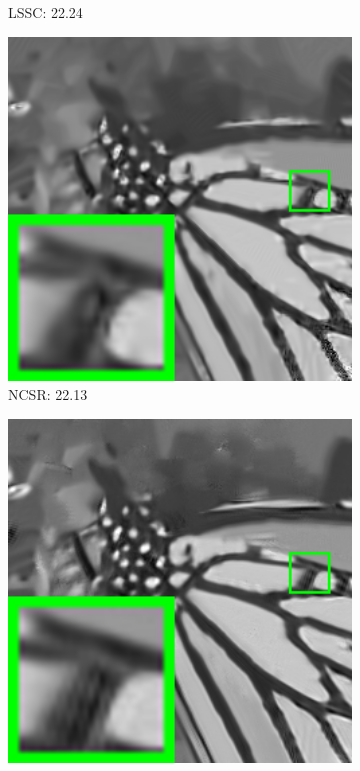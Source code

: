 \begin{figure}
\begin{adjustwidth}{-2cm}{}
\begin{subfigure}[t]{0.19\textwidth}
		\caption{LSSC: 22.24}
    \end{subfigure}
    \hfill
    \begin{subfigure}[t]{0.19\textwidth}
        \centering
        \includegraphics[width=1\textwidth]{images/twsc/awgn/br_NCSR_100_monarch.png}
		\caption{NCSR: 22.13}
    \end{subfigure}
    \hfill
    \begin{subfigure}[t]{0.19\textwidth}
        \centering
        \includegraphics[width=1\textwidth]{images/twsc/awgn/br_WNNM_100_monarch.png}

\end{subfigure}
\end{adjustwidth}
\end{figure}
